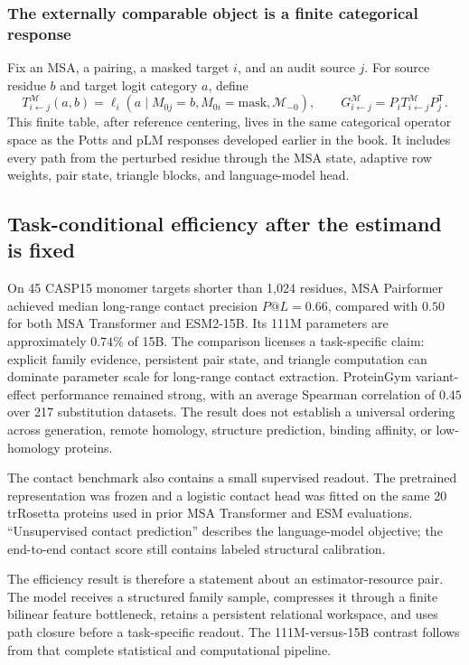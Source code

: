 \subsubsection{The externally comparable object is a finite categorical response}

Fix an MSA, a pairing, a masked target $i$, and an audit source $j$.  For source residue $b$ and
target logit category $a$, define
\begin{equation}
T^{\mathcal M}_{i\leftarrow j}(a,b)
=\ell_i\!\left(a\mid M_{0j}=b,M_{0i}=\mathrm{mask},\mathcal M_{-0}\right),
\qquad
G^{\mathcal M}_{i\leftarrow j}=P_iT^{\mathcal M}_{i\leftarrow j}P_j^{\mathsf T}.
\label{eq:msa-pairformer-finite-categorical-response}
\end{equation}
This finite table, after reference centering, lives in the same categorical operator space as the
Potts and pLM responses developed earlier in the book.  It includes every path from the perturbed
residue through the MSA state, adaptive row weights, pair state, triangle blocks, and language-model
head.
\subsection{Task-conditional efficiency after the estimand is fixed}

On 45 CASP15 monomer targets shorter than 1,024 residues, MSA Pairformer achieved median long-range
contact precision $P@L=0.66$, compared with $0.50$ for both MSA Transformer and ESM2-15B.  Its 111M
parameters are approximately $0.74\%$ of 15B.  The comparison licenses a task-specific claim:
explicit family evidence, persistent pair state, and triangle computation can dominate parameter
scale for long-range contact extraction.  ProteinGym variant-effect performance remained strong,
with an average Spearman correlation of $0.45$ over 217 substitution datasets.  The result does not
establish a universal ordering across generation, remote homology, structure prediction, binding
affinity, or low-homology proteins.

The contact benchmark also contains a small supervised readout.  The pretrained representation was
frozen and a logistic contact head was fitted on the same 20 trRosetta proteins used in prior MSA
Transformer and ESM evaluations.  ``Unsupervised contact prediction'' describes the language-model
objective; the end-to-end contact score still contains labeled structural calibration.

The efficiency result is therefore a statement about an estimator-resource pair.  The model
receives a structured family sample, compresses it through a finite bilinear feature bottleneck,
retains a persistent relational workspace, and uses path closure before a task-specific readout.
The 111M-versus-15B contrast follows from that complete statistical and computational pipeline.

